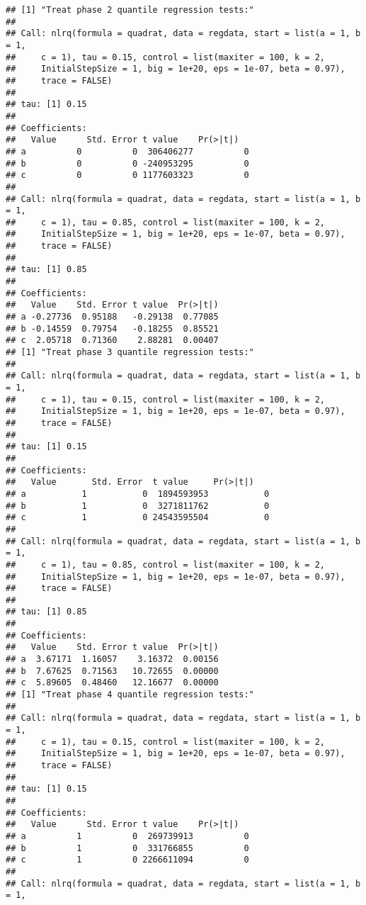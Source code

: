\documentclass[
]{article}
\begin{document}
\begin{verbatim}
## [1] "Treat phase 2 quantile regression tests:"
## 
## Call: nlrq(formula = quadrat, data = regdata, start = list(a = 1, b = 1, 
##     c = 1), tau = 0.15, control = list(maxiter = 100, k = 2, 
##     InitialStepSize = 1, big = 1e+20, eps = 1e-07, beta = 0.97), 
##     trace = FALSE)
## 
## tau: [1] 0.15
## 
## Coefficients:
##   Value      Std. Error t value    Pr(>|t|)  
## a          0          0  306406277          0
## b          0          0 -240953295          0
## c          0          0 1177603323          0
## 
## Call: nlrq(formula = quadrat, data = regdata, start = list(a = 1, b = 1, 
##     c = 1), tau = 0.85, control = list(maxiter = 100, k = 2, 
##     InitialStepSize = 1, big = 1e+20, eps = 1e-07, beta = 0.97), 
##     trace = FALSE)
## 
## tau: [1] 0.85
## 
## Coefficients:
##   Value    Std. Error t value  Pr(>|t|)
## a -0.27736  0.95188   -0.29138  0.77085
## b -0.14559  0.79754   -0.18255  0.85521
## c  2.05718  0.71360    2.88281  0.00407
## [1] "Treat phase 3 quantile regression tests:"
## 
## Call: nlrq(formula = quadrat, data = regdata, start = list(a = 1, b = 1, 
##     c = 1), tau = 0.15, control = list(maxiter = 100, k = 2, 
##     InitialStepSize = 1, big = 1e+20, eps = 1e-07, beta = 0.97), 
##     trace = FALSE)
## 
## tau: [1] 0.15
## 
## Coefficients:
##   Value       Std. Error  t value     Pr(>|t|)   
## a           1           0  1894593953           0
## b           1           0  3271811762           0
## c           1           0 24543595504           0
## 
## Call: nlrq(formula = quadrat, data = regdata, start = list(a = 1, b = 1, 
##     c = 1), tau = 0.85, control = list(maxiter = 100, k = 2, 
##     InitialStepSize = 1, big = 1e+20, eps = 1e-07, beta = 0.97), 
##     trace = FALSE)
## 
## tau: [1] 0.85
## 
## Coefficients:
##   Value    Std. Error t value  Pr(>|t|)
## a  3.67171  1.16057    3.16372  0.00156
## b  7.67625  0.71563   10.72655  0.00000
## c  5.89605  0.48460   12.16677  0.00000
## [1] "Treat phase 4 quantile regression tests:"
## 
## Call: nlrq(formula = quadrat, data = regdata, start = list(a = 1, b = 1, 
##     c = 1), tau = 0.15, control = list(maxiter = 100, k = 2, 
##     InitialStepSize = 1, big = 1e+20, eps = 1e-07, beta = 0.97), 
##     trace = FALSE)
## 
## tau: [1] 0.15
## 
## Coefficients:
##   Value      Std. Error t value    Pr(>|t|)  
## a          1          0  269739913          0
## b          1          0  331766855          0
## c          1          0 2266611094          0
## 
## Call: nlrq(formula = quadrat, data = regdata, start = list(a = 1, b = 1, 

\end{verbatim}
\end{document}
